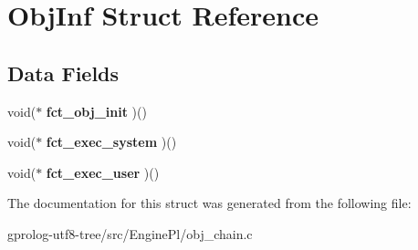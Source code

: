 \hypertarget{structObjInf}{}\section{Obj\+Inf Struct Reference}
\label{structObjInf}
\subsection*{Data Fields}
\begin{DoxyCompactItemize}
\item 
void($\ast$ {\bfseries fct\+\_\+obj\+\_\+init} )()\hypertarget{structObjInf_a87ba4456d48d1ca4b94a0d0e7f44650c}{}\label{structObjInf_a87ba4456d48d1ca4b94a0d0e7f44650c}

\item 
void($\ast$ {\bfseries fct\+\_\+exec\+\_\+system} )()\hypertarget{structObjInf_a5b3f237a232e4cfae91c10bfe78f163f}{}\label{structObjInf_a5b3f237a232e4cfae91c10bfe78f163f}

\item 
void($\ast$ {\bfseries fct\+\_\+exec\+\_\+user} )()\hypertarget{structObjInf_a394489a76d14d4711797e459a15ebfb4}{}\label{structObjInf_a394489a76d14d4711797e459a15ebfb4}

\end{DoxyCompactItemize}


The documentation for this struct was generated from the following file\+:\begin{DoxyCompactItemize}
\item 
gprolog-\/utf8-\/tree/src/\+Engine\+Pl/obj\+\_\+chain.\+c\end{DoxyCompactItemize}
